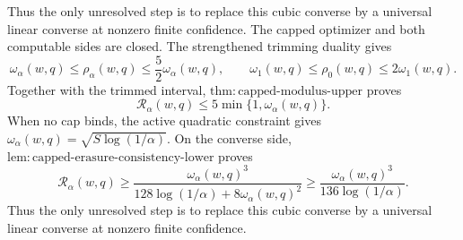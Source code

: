 Thus the only unresolved step is to replace this cubic converse by a universal linear converse at nonzero finite confidence.
The capped optimizer and both computable sides are closed.  The strengthened trimming duality gives
\[
 \omega_\alpha(w,q)\le\rho_\alpha(w,q)
 \le\frac52\omega_\alpha(w,q),
 \qquad
 \omega_1(w,q)\le\rho_0(w,q)\le2\omega_1(w,q).
\]
Together with the trimmed interval, \(\mathrm{thm{:}capped\text{-}modulus\text{-}upper}\) proves
\[
 \mathcal R_\alpha(w,q)
 \le5\min\{1,\omega_\alpha(w,q)\}.
\]
When no cap binds, the active quadratic constraint gives
\(\omega_\alpha(w,q)=\sqrt{S\log(1/\alpha)}\).  On the converse side, \(\mathrm{lem{:}capped\text{-}erasure\text{-}consistency\text{-}lower}\) proves
\[
 \mathcal R_\alpha(w,q)
 \ge
 \frac{\omega_\alpha(w,q)^3}
 {128\log(1/\alpha)+8\omega_\alpha(w,q)^2}
 \ge
 \frac{\omega_\alpha(w,q)^3}{136\log(1/\alpha)}.
\]
Thus the only unresolved step is to replace this cubic converse by a universal linear converse at nonzero finite confidence.

